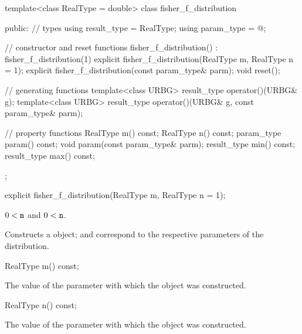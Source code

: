 %
\begin{codeblock}
template<class RealType = double>
  class fisher_f_distribution {
  public:
    // types
    using result_type = RealType;
    using param_type  = @\unspec@;

    // constructor and reset functions
    fisher_f_distribution() : fisher_f_distribution(1) {}
    explicit fisher_f_distribution(RealType m, RealType n = 1);
    explicit fisher_f_distribution(const param_type& parm);
    void reset();

    // generating functions
    template<class URBG>
      result_type operator()(URBG& g);
    template<class URBG>
      result_type operator()(URBG& g, const param_type& parm);

    // property functions
    RealType m() const;
    RealType n() const;
    param_type param() const;
    void param(const param_type& parm);
    result_type min() const;
    result_type max() const;
  };
\end{codeblock}


%
\begin{itemdecl}
explicit fisher_f_distribution(RealType m, RealType n = 1);
\end{itemdecl}

\begin{itemdescr}
\pnum
\requires $0 < \texttt{m}$ and $0 < \texttt{n}$.

\pnum
\effects Constructs a  object;
 and 
correspond to the respective parameters of the distribution.
\end{itemdescr}

%
\begin{itemdecl}
RealType m() const;
\end{itemdecl}

\begin{itemdescr}
\pnum\returns The value of the  parameter
 with which the object was constructed.
\end{itemdescr}

%
\begin{itemdecl}
RealType n() const;
\end{itemdecl}

\begin{itemdescr}
\pnum\returns The value of the  parameter
 with which the object was constructed.
\end{itemdescr}

